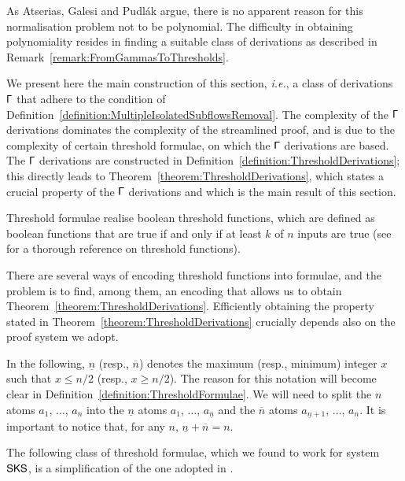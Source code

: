 As Atserias, Galesi and Pudl\'ak argue, there is no apparent reason for this normalisation problem not to be polynomial. The difficulty in obtaining polynomiality resides in finding a suitable class of derivations as described in Remark~\vref{remark:FromGammasToThresholds}.

We present here the main construction of this section, \emph{i.e.}, a class of derivations $\mathsf\Gamma$ that adhere to the condition of Definition~\vref{definition:MultipleIsolatedSubflowsRemoval}. The complexity of the $\mathsf\Gamma$ derivations dominates the complexity of the streamlined proof, and is due to the complexity of certain threshold formulae, on which the $\mathsf\Gamma$ derivations are based. The $\mathsf\Gamma$ derivations are constructed in Definition~\vref{definition:ThresholdDerivations}; this directly leads to Theorem~\vref{theorem:ThresholdDerivations}, which states a crucial property of the $\mathsf\Gamma$ derivations and which is the main result of this section.

Threshold formulae realise boolean threshold functions, which are defined as boolean functions that are true if and only if at least $k$ of $n$ inputs are true (see \cite{Wege:87:The-Comp:vn} for a thorough reference on threshold functions).

There are several ways of encoding threshold functions into formulae, and the problem is to find, among them, an encoding that allows us to obtain Theorem~\vref{theorem:ThresholdDerivations}. Efficiently obtaining the property stated in Theorem~\ref{theorem:ThresholdDerivations} crucially depends also on the proof system we adopt.



In the following, $\underline  n$ (resp., $\overline  n$) denotes the maximum (resp., minimum) integer $x$ such that $x\le n/2$ (resp., $x\ge n/2$). The reason for this notation will become clear in Definition~\vref{definition:ThresholdFormulae}. We will need to split the $n$ atoms $a_1$, $\dots$, $a_n$ into the $\underline  n$ atoms $a_1$, $\dots$, $a_{\underline  n}$ and the $\overline  n$ atoms $a_{\underline  n+1}$, $\dots$, $a_n$. It is important to notice that, for any $n$, $\underline n+\overline n=n$.

The following class of threshold formulae, which we found to work for system $\mathsf{SKS}$, is a simplification of the one adopted in \cite{AtseGalePudl:02:Monotone:yu}.

